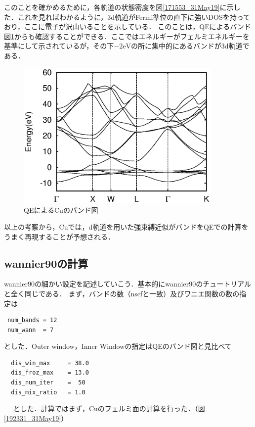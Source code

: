\documentclass[a4j]{jarticle}
\begin{document}
	 このことを確かめるために，各軌道の状態密度を図\ref{171553_31May19}に示した．これを見ればわかるように，3d軌道がFermi準位の直下に強いDOSを持っており，ここに電子が沢山いることを示している．
  このことは，QEによるバンド図\ref{191823_31May19}からも確認することができる．ここではエネルギーがフェルミエネルギーを基準にして示されているが，その下$-2\mathrm{eV}$の所に集中的にあるバンドが3d軌道である．

    \begin{figure}[htb]
       \begin{center}
	\includegraphics[width=10cm]{Cu.bands.eps}
	\caption{QEによるCuのバンド図}
	\label{191823_31May19}
       \end{center}
    \end{figure}


  以上の考察から，Cuでは，d軌道を用いた強束縛近似がバンドをQEでの計算をうまく再現することが予想される．



\subsection{wannier90の計算}
wannier90の細かい設定を記述していこう．基本的にwannier90のチュートリアルと全く同じである．
まず，バンドの数（nscfと一致）及びワニエ関数の数の指定は
\begin{lstlisting}
 num_bands = 12
 num_wann  = 7
\end{lstlisting}
とした．Outer window，Inner Windowの指定はQEのバンド図と見比べて
 \begin{lstlisting}
  dis_win_max     = 38.0
  dis_froz_max    = 13.0
  dis_num_iter    =  50
  dis_mix_ratio   = 1.0
 \end{lstlisting}　
 とした．計算ではまず，Cuのフェルミ面の計算を行った．（図\ref{192331_31May19}）
\end{document}
